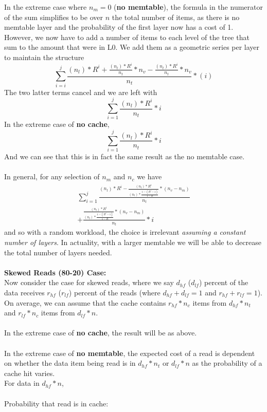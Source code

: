 \documentclass{sig-alternate-05-2015}
\begin{document}
In the extreme case where $n_m=0$ (\textbf{no memtable}), the formula in the numerator of the sum simplifies to be over $n$ the total number of items, as there is no memtable layer and the probability of the first layer now has a cost of 1. However, we now have to add a number of items to each level of the tree that sum to the amount that were in L0. We add them as a geometric series per layer to maintain the structure
$$
\sum_{i=i}^{j} \frac{(n_l) * R^{i} + \frac{(n_l) * R^{i}}{n_t} * n_v - \frac{(n_l) * R^{i}}{n_t} * n_v}{n_t} * (i)
$$
The two latter terms cancel and we are left with
$$
\sum_{i=1}^j \frac{(n_l) * R^i}{n_t} * i 
$$
In the extreme case of \textbf{no cache}, 
$$
\sum_{i=1}^j \frac{(n_l) * R^i}{n_t} * i 
$$
And we can see that this is in fact the same result as the no memtable case. \\ \\
In general, for any selection of $n_m$ and $n_c$ we have
\begin{multline}
\sum_{i=1}^j \frac{(n_l) * R^i - \frac{(n_l) * R^i}{(n_l) * \frac{1-(R^j-1)}{1-R}} * (n_v-n_m)}{n_t} \\+
\frac{\frac{(n_l) * R^i}{(n_l) * \frac{1-(R^j-1)}{1-R}} * (n_v-n_m)}{n_t} * i 
\end{multline}
and so with a random workload, the choice is irrelevant \textit{assuming a constant number of layers}. In actuality, with a larger memtable we will be able to decrease the total number of layers needed. \\
\\
\textbf{Skewed Reads (80-20) Case:}\\
Now consider the case for skewed reads, where we say $d_{hf}$ ($d_{lf}$) percent of the data receives $r_{hf}$ ($r_{lf}$) percent of the reads (where $d_{hf} + d_{lf} = 1$ and $r_{hf} + r_{lf} = 1$). On average, we can assume that the cache contains $r_{hf} * n_c$ items from $d_{hf} * n_t$ and $r_{lf} * n_c$ items from $d_{lf} * n$. \\ \\
In the extreme case of \textbf{no cache}, the result will be as above. \\ \\
In the extreme case of \textbf{no memtable}, the expected cost of a read is dependent on whether the data item being read is in $d_{hf} * n_t$ or $d_{lf} * n$ as the probability of a cache hit varies.\\
For data in $d_{hf} * n$, \\ \\
Probability that read is in cache:
\end{document}
